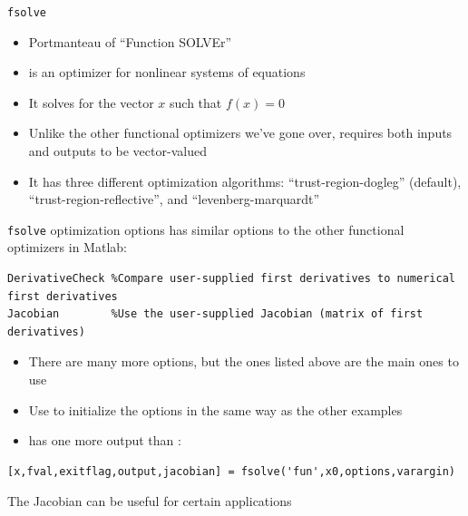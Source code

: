 \documentclass[english,xcolor=dvipsnames]{beamer}
\begin{document}
\begin{frame}[fragile]{\texttt{fsolve}}
\begin{itemize}
	\item Portmanteau of ``Function SOLVEr''
	\item {} is an optimizer for nonlinear systems of equations
	\item It solves for the vector $x$ such that $f\left(x\right)=0$
	\item Unlike the other functional optimizers we've gone over,  requires both inputs and outputs to be vector-valued
	\item It has three different optimization algorithms: ``trust-region-dogleg'' (default), ``trust-region-reflective'', and ``levenberg-marquardt''
\end{itemize}
\end{frame}

\begin{frame}[fragile]{\texttt{fsolve} optimization options}
 has similar options to the other functional optimizers in Matlab:
\begin{lstlisting}
DerivativeCheck	%Compare user-supplied first derivatives to numerical first derivatives
Jacobian        %Use the user-supplied Jacobian (matrix of first derivatives)
\end{lstlisting}
\begin{itemize}
	\item There are many more options, but the ones listed above are the main ones to use
	\item Use  to initialize the options in the same way as the other examples
	\item {} has one more output than :
\end{itemize}
\begin{lstlisting}
[x,fval,exitflag,output,jacobian] = fsolve('fun',x0,options,varargin)
\end{lstlisting}
The Jacobian can be useful for certain applications
\end{frame}
\end{document}
